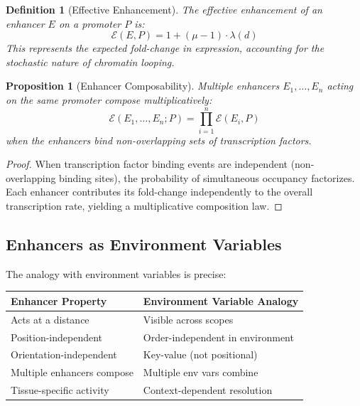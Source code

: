 \documentclass[12pt,a4paper]{article}
\newtheorem{proposition}[theorem]{Proposition}
\newtheorem{definition}[theorem]{Definition}
\begin{document}
\begin{definition}[Effective Enhancement]\label{def:effective-enhancement}
The \emph{effective enhancement} of an enhancer $E$ on a promoter $P$ is:
\[
\mathcal{E}(E, P) = 1 + (\mu - 1) \cdot \lambda(d)
\]
This represents the expected fold-change in expression, accounting for the stochastic nature of chromatin looping.
\end{definition}

\begin{proposition}[Enhancer Composability]\label{prop:enhancer-compose}
Multiple enhancers $E_1, \ldots, E_n$ acting on the same promoter compose multiplicatively:
\[
\mathcal{E}(E_1, \ldots, E_n; P) = \prod_{i=1}^n \mathcal{E}(E_i, P)
\]
when the enhancers bind non-overlapping sets of transcription factors.
\end{proposition}

\begin{proof}
When transcription factor binding events are independent (non-overlapping binding sites), the probability of simultaneous occupancy factorizes.  Each enhancer contributes its fold-change independently to the overall transcription rate, yielding a multiplicative composition law.
\end{proof}

\subsection{Enhancers as Environment Variables}

The analogy with environment variables is precise:

\begin{center}
\begin{tabular}{ll}
\toprule
\textbf{Enhancer Property} & \textbf{Environment Variable Analogy} \\
\midrule
Acts at a distance & Visible across scopes \\
Position-independent & Order-independent in environment \\
Orientation-independent & Key-value (not positional) \\
Multiple enhancers compose & Multiple env vars combine \\
Tissue-specific activity & Context-dependent resolution \\
\bottomrule
\end{tabular}
\end{center}


\end{document}
